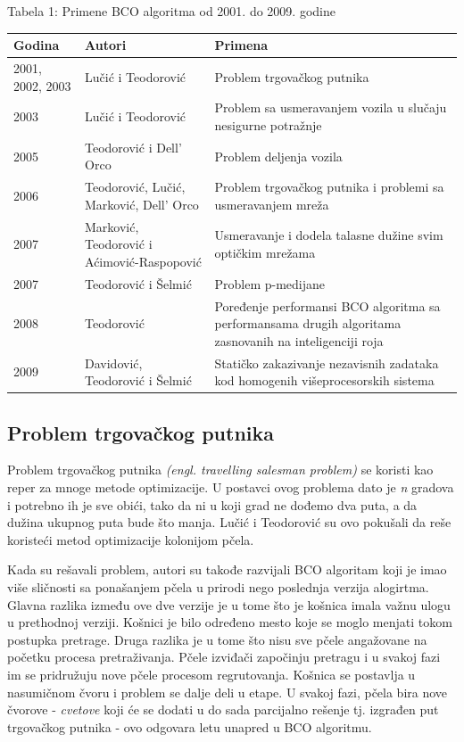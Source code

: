 \documentclass[a4paper]{article}
\begin{document}
{\begin{center}
Tabela 1: Primene BCO algoritma od 2001. do 2009. godine
\begin{tabular}{|p{1cm}|p{3cm}|p{5cm}|}
 \hline
Godina & Autori & Primena \\ \hline
2001, 2002, 2003&Lučić i Teodorović&Problem trgovačkog putnika\\ \hline
2003&Lučić i Teodorović&Problem sa usmeravanjem vozila u slučaju nesigurne potražnje\\ \hline
2005&Teodorović i Dell’ Orco&Problem deljenja vozila\\ \hline
2006&Teodorović, Lučić, Marković, Dell’ Orco & Problem trgovačkog putnika i problemi sa usmeravanjem mreža\\ \hline
2007&Marković, Teodorović i Aćimović-Raspopović & Usmeravanje i dodela talasne dužine svim optičkim mrežama\\ \hline
2007& Teodorović i Šelmić & Problem p-medijane\\ \hline
2008& Teodorović & Poređenje performansi BCO algoritma sa performansama drugih algoritama zasnovanih na inteligenciji roja\\ \hline
2009& Davidović, Teodorović i Šelmić & Statičko zakazivanje nezavisnih zadataka kod homogenih višeprocesorskih sistema\\ \hline
\end{tabular}\par
\bigskip
\end{center}

\subsection{Problem trgovačkog putnika}
\label{subsec:prvaprimena}
Problem trgovačkog putnika {\em (engl. travelling salesman problem)} se koristi kao reper za mnoge metode optimizacije. U postavci ovog problema dato je {\em n} gradova i potrebno ih je sve obići, tako da ni u koji grad ne dođemo dva puta, a da dužina ukupnog puta bude što manja. Lučić i Teodorović su ovo pokušali da reše koristeći metod optimizacije kolonijom pčela.

Kada su rešavali problem, autori su takođe razvijali BCO algoritam koji je imao više sličnosti sa ponašanjem pčela u prirodi nego poslednja verzija alogirtma. Glavna razlika između ove dve verzije je u tome što je košnica imala važnu ulogu u prethodnoj verziji. Košnici je bilo određeno mesto koje se moglo menjati tokom postupka pretrage. Druga razlika je u tome što nisu sve pčele angažovane na početku procesa pretraživanja. Pčele izviđači započinju pretragu i u svakoj fazi im se pridružuju nove pčele procesom regrutovanja. Košnica se postavlja u nasumičnom čvoru i problem se dalje deli u etape. U svakoj fazi, pčela bira nove čvorove - {\em{cvetove}} koji će se dodati u do sada parcijalno rešenje tj. izgrađen put trgovačkog putnika - ovo odgovara letu unapred u BCO algoritmu. 

}
\end{document}
